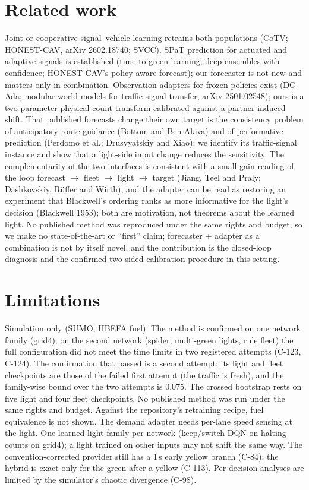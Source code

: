 \documentclass[11pt]{article}
\begin{document}
\section{Related work}
Joint or cooperative signal--vehicle learning retrains both populations (CoTV; HONEST-CAV, arXiv 2602.18740; SVCC). SPaT prediction for
actuated and adaptive signals is established (time-to-green learning; deep ensembles with confidence; HONEST-CAV's policy-aware
forecast); our forecaster is not new and matters only in combination. Observation adapters for frozen policies exist (DC-Ada; modular
world models for traffic-signal transfer, arXiv 2501.02548); ours is a two-parameter physical count transform calibrated against a
partner-induced shift. That published forecasts change their own target is the consistency problem of anticipatory route guidance (Bottom
and Ben-Akiva) and of performative prediction (Perdomo et al.; Drusvyatskiy and Xiao); we identify its traffic-signal instance and show that
a light-side input change reduces the sensitivity. The complementarity of the two interfaces is consistent with a small-gain reading of the loop forecast $\to$ fleet
$\to$ light $\to$ target (Jiang, Teel and Praly; Dashkovskiy, R\"uffer and Wirth), and the adapter can be read as restoring an experiment
that Blackwell's ordering ranks as more informative for the light's decision (Blackwell 1953); both are motivation, not theorems about the
learned light. No published method was reproduced under the same rights and budget, so we make no state-of-the-art or ``first''
claim; forecaster + adapter as a combination is not by itself novel, and the contribution is the closed-loop diagnosis and the
confirmed two-sided calibration procedure in this setting.

\section{Limitations}
Simulation only (SUMO, HBEFA fuel). The method is confirmed on one network family (grid4); on the second network (spider, multi-green
lights, rule fleet) the full configuration did not meet the time limits in two registered attempts (C-123, C-124). The confirmation that
passed is a second attempt; its light and fleet checkpoints are those of the failed first attempt (the traffic is fresh), and the
family-wise bound over the two attempts is $0.075$. The crossed bootstrap rests on five light and four fleet checkpoints. No published
method was run under the same rights and budget. Against the repository's retraining recipe, fuel equivalence is not shown. The demand
adapter needs per-lane speed sensing at the light. One learned-light family per network (keep/switch DQN on halting counts on grid4); a
light trained on other inputs may not shift the same way. The convention-corrected provider still has a 1\,s early yellow branch (C-84);
the hybrid is exact only for the green after a yellow (C-113). Per-decision analyses are limited by the simulator's chaotic divergence
(C-98).
\end{document}

